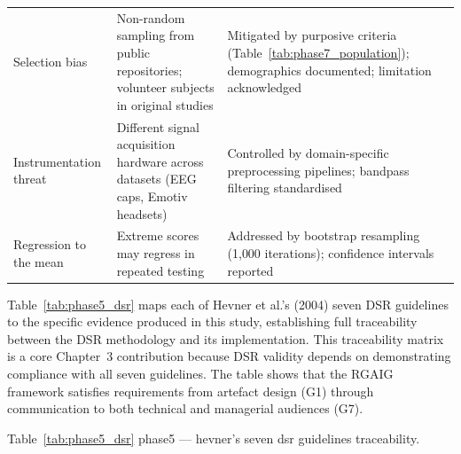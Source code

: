 \begin{xltabular}{\textwidth}{@{} p{0.16\textwidth} X X @{}}
\addlinespace
Selection bias                & Non-random sampling from public repositories; volunteer subjects in original studies & Mitigated by purposive criteria (Table~\ref{tab:phase7_population}); demographics documented; limitation acknowledged \\
\addlinespace
Instrumentation threat        & Different signal acquisition hardware across datasets (EEG caps, Emotiv headsets) & Controlled by domain-specific preprocessing pipelines; bandpass filtering standardised \\
\addlinespace
Regression to the mean        & Extreme scores may regress in repeated testing & Addressed by bootstrap resampling (1{,}000 iterations); confidence intervals reported \\
\end{xltabular}
\endgroup

\vspace{1.5em}

Table~\ref{tab:phase5_dsr} maps each of Hevner et al.'s (2004) seven DSR guidelines to the specific evidence produced in this study, establishing full traceability between the DSR methodology and its implementation. This traceability matrix is a core Chapter~3 contribution because DSR validity depends on demonstrating compliance with all seven guidelines. The table shows that the RGAIG framework satisfies requirements from artefact design (G1) through communication to both technical and managerial audiences (G7).

\begingroup\singlespacing\tablefontsize\tablestripes
\noindent Table~\ref{tab:phase5_dsr} phase5 --- hevner's seven dsr guidelines traceability.

